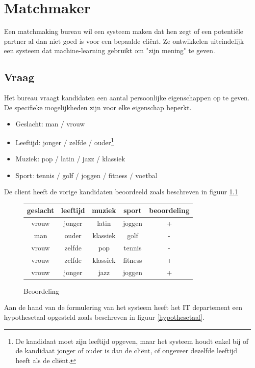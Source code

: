 \documentclass[alternative-exam.tex]{subfiles}
\begin{document}
\chapter{Matchmaker}
Een matchmaking bureau wil een systeem maken dat hen zegt of een potenti\"ele partner al dan niet goed is voor een bepaalde cli\"ent. Ze ontwikkelen uiteindelijk een systeem dat machine-learning gebruikt om "zijn mening" te geven.

\section{Vraag}
Het bureau vraagt kandidaten een aantal persoonlijke eigenschappen op te geven.
De specifieke mogelijkheden zijn voor elke eigenschap beperkt.
\begin{itemize}
\item Geslacht: man / vrouw
\item Leeftijd: jonger / zelfde / ouder\footnote{De kandidaat moet zijn leeftijd opgeven, maar het systeem houdt enkel bij of de kandidaat jonger of ouder is dan de cli\"ent, of ongeveer dezelfde leeftijd heeft als de cli\"ent.}
\item Muziek: pop / latin / jazz  / klassiek
\item Sport: tennis / golf / joggen / fitness / voetbal
\end{itemize}
De client heeft de vorige kandidaten beoordeeld zoals beschreven in figuur \ref{beoordeling}
\begin{figure}[H]
\centering
\caption{Beoordeling}
\label{beoordeling}
\begin{tabular}{|c|c|c|c|c|}
\hline
geslacht & leeftijd & muziek & sport & beoordeling\\
\hline
vrouw & jonger & latin & joggen & +\\
man & ouder & klassiek & golf & -\\
vrouw & zelfde & pop & tennis & -\\
vrouw & zelfde & klassiek & fitness & +\\
vrouw & jonger & jazz & joggen & +\\
\hline
\end{tabular}
\end{figure}
Aan de hand van de formulering van het systeem heeft het IT departement een hypothesetaal opgesteld zoals beschreven in figuur \ref{hypothesetaal}.
\end{document}
